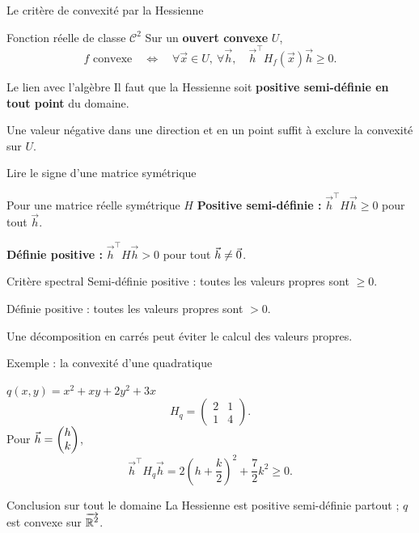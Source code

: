\begin{frame}[t]{Le critère de convexité par la Hessienne}
\coursanalyse
\begin{theoreme}{Fonction réelle de classe $\mathcal C^2$}
Sur un \textbf{ouvert convexe} $U$,
\[f\text{ convexe}\quad\Longleftrightarrow\quad
\forall\vec x\in U,\ \forall\vec h,\quad\vec h^\top H_f(\vec x)\vec h\ge0.\]
\end{theoreme}
\begin{resultat}{Le lien avec l’algèbre}
Il faut que la Hessienne soit \textbf{positive semi-définie en tout point} du domaine.
\end{resultat}
\vfill Une valeur négative dans une direction et en un point suffit à exclure la convexité sur $U$.
\end{frame}

\begin{frame}[t]{Lire le signe d’une matrice symétrique}
\coursanalyse
\begin{cours}{Pour une matrice réelle symétrique $H$}
\textbf{Positive semi-définie :} $\vec h^\top H\vec h\ge0$ pour tout $\vec h$.

\medskip
\textbf{Définie positive :} $\vec h^\top H\vec h>0$ pour tout $\vec h\ne\vec 0$.
\end{cours}
\begin{theoreme}{Critère spectral}
Semi-définie positive : toutes les valeurs propres sont $\ge0$.

\medskip
Définie positive : toutes les valeurs propres sont $>0$.
\end{theoreme}
\vfill Une décomposition en carrés peut éviter le calcul des valeurs propres.
\end{frame}

\begin{frame}[t]{Exemple : la convexité d’une quadratique}
\coursanalyse
\begin{exemple}{$q(x,y)=x^2+xy+2y^2+3x$}
\[H_q=\begin{pmatrix}2&1\\1&4\end{pmatrix}.\]
Pour $\vec h=\begin{pmatrix}h\\k\end{pmatrix}$,
\[\vec h^\top H_q\vec h=2\left(h+\frac k2\right)^2+\frac72k^2\ge0.\]
\end{exemple}
\begin{resultat}{Conclusion sur tout le domaine}
La Hessienne est positive semi-définie partout ; $q$ est convexe sur $\overrightarrow{\mathbb R^{2}}$.
\end{resultat}
\end{frame}

